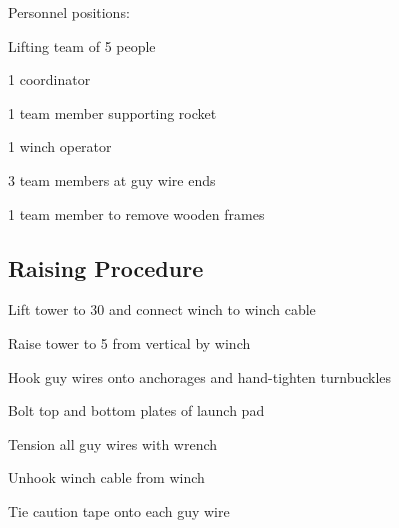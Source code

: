 \begin{checklist}[label=$\bullet$]
    \item Personnel positions:
    \begin{checklist}
        \item Lifting team of 5 people
        \item 1 coordinator
        \item 1 team member supporting rocket
        \item 1 winch operator
        \item 3 team members at guy wire ends
        \item 1 team member to remove wooden frames
    \end{checklist}
\end{checklist}

\subsection{Raising Procedure}
\begin{checklist}
\item Lift tower to 30\degree{} and connect winch to winch cable
\item Raise tower to 5\degree{} from vertical by winch
\item Hook guy wires onto anchorages and hand-tighten turnbuckles
\item Bolt top and bottom plates of launch pad
\item Tension all guy wires with wrench
\item Unhook winch cable from winch
\item Tie caution tape onto each guy wire
\end{checklist}

